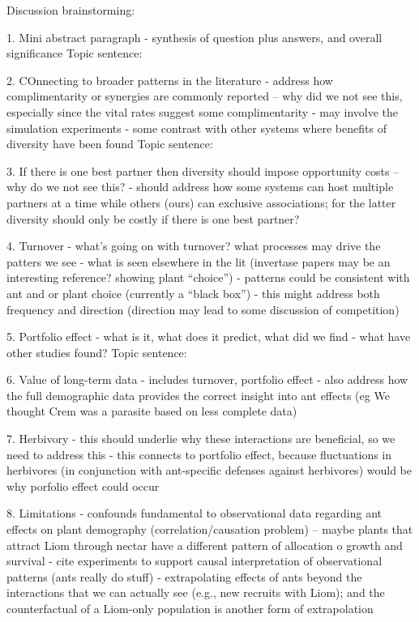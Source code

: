 \documentclass[11pt]{article}
\begin{document}

Discussion brainstorming:

1. Mini abstract paragraph
- synthesis of question plus answers, and overall significance
Topic sentence: 

2. COnnecting to broader patterns in the literature
- address how complimentarity or synergies are commonly reported -- why did we not see this, especially since the vital rates suggest some complimentarity
- may involve the simulation experiments
- some contrast with other systems where benefits of diversity have been found
Topic sentence: 

3. If there is one best partner then diversity should impose opportunity costs -- why do we not see this?
- should address how some systems can host multiple partners at a time while others (ours) can exclusive associations; for the latter diversity should only be costly if there is one best partner?

4. Turnover
- what's going on with turnover? what processes may drive the patters we see
- what is seen elsewhere in the lit (invertase papers may be an interesting reference? showing plant ``choice'')
- patterns could be consistent with ant and or plant choice (currently a ``black box'')
- this might address both frequency and direction (direction may lead to some discussion of competition)

5.  Portfolio effect
- what is it, what does it predict, what did we find
- what have other studies found? 
Topic sentence: 

6. Value of long-term data
- includes turnover, portfolio effect
- also address how the full demographic data provides the correct insight into ant effects (eg We thought Crem was a parasite based on less complete data)

7. Herbivory
- this should underlie why these interactions are beneficial, so we need to address this
- this connects to portfolio effect, because fluctuations in herbivores (in conjunction with ant-specific defenses against herbivores) would be why porfolio effect could occur

8. Limitations
- confounds fundamental to observational data regarding ant effects on plant demography (correlation/causation problem) -- maybe plants that attract Liom through nectar have a different pattern of allocation o growth and survival
- cite experiments to support causal interpretation of observational patterns (ants really do stuff)
- extrapolating effects of ants beyond the interactions that we can actually see (e.g., new recruits with Liom); and the counterfactual of a Liom-only population is another form of extrapolation
\end{document}
